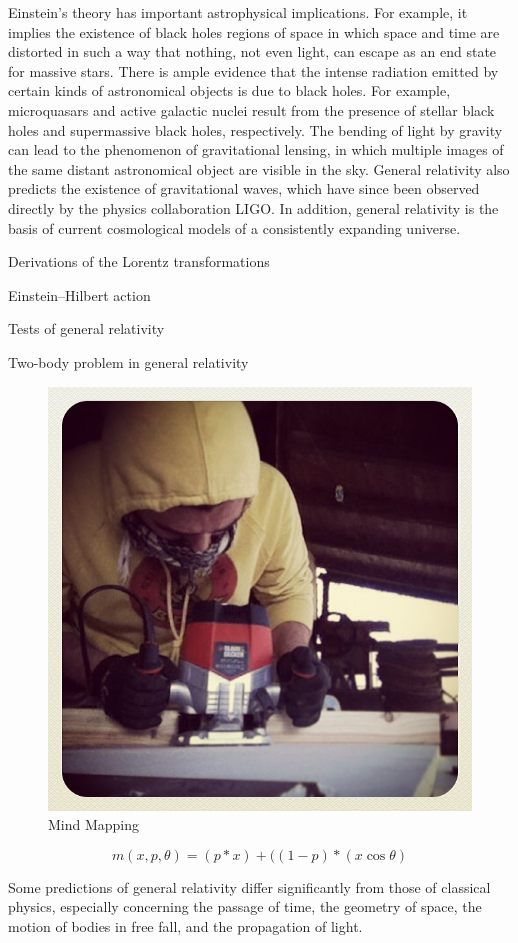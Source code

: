 \documentclass[
	a4paper,
	twocolumn
	]{article}
\begin{document}
Einstein's theory has important astrophysical implications. For example, it
implies the existence of black holes regions of space in which space and time
are distorted in such a way that nothing, not even light, can escape as an
end state for massive stars. There is ample evidence that the intense radiation
emitted by certain kinds of astronomical objects is due to black holes. For
example, microquasars and active galactic nuclei result from the presence of
stellar black holes and supermassive black holes, respectively. The bending of
light by gravity can lead to the phenomenon of gravitational lensing, in which
multiple images of the same distant astronomical object are visible in the sky.
General relativity also predicts the existence of gravitational waves, which
have since been observed directly by the physics collaboration LIGO. In addition,
general relativity is the basis of current cosmological models of a consistently
expanding universe.

\begin{compactitem}
\item Derivations of the Lorentz transformations
\item Einstein–Hilbert action
\item Tests of general relativity
\item Two-body problem in general relativity
\end{compactitem}

\begin{figure}[t]
\centering
\includegraphics[width=.47\textwidth]{img/image2.jpg}
\caption{Mind Mapping}
\label{gs}
\end{figure}

\begin{equation}
m(x,p,\theta) = (p*x) + ((1-p)*(x\cos\theta)
\label{eq:mid}
\end{equation}

Some predictions of general relativity differ significantly from those of
classical physics, especially concerning the passage of time, the geometry of
space, the motion of bodies in free fall, and the propagation of light.
\end{document}
